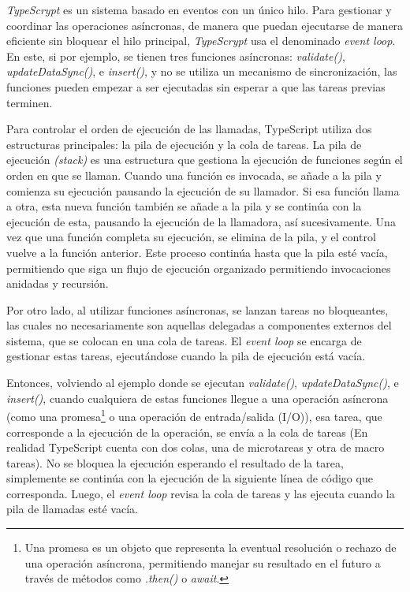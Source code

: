 \textit{TypeScrypt} es un sistema basado en eventos con un único hilo. Para gestionar y coordinar las operaciones asíncronas, de manera que puedan ejecutarse de manera eficiente sin bloquear el hilo principal, \textit{TypeScrypt} usa el denominado \textit{event loop}\cite{ecma262}. En este, si por ejemplo, se tienen tres funciones asíncronas: \textit{validate()}, \textit{updateDataSync()}, e \textit{insert()}, y no se utiliza un mecanismo de sincronización, las funciones pueden empezar a ser ejecutadas sin esperar a que las tareas previas terminen.

Para controlar el orden de ejecución de las llamadas, TypeScript utiliza dos estructuras principales: la pila de ejecución y la cola de tareas. La pila de ejecución \textit{(stack)} es una estructura que gestiona la ejecución de funciones según el orden en que se llaman. Cuando una función es invocada, se añade a la pila y comienza su ejecución pausando la ejecución de su llamador. Si esa función llama a otra, esta nueva función también se añade a la pila y se continúa con la ejecución de esta, pausando la ejecución de la llamadora, así sucesivamente. Una vez que una función completa su ejecución, se elimina de la pila, y el control vuelve a la función anterior. Este proceso continúa hasta que la pila esté vacía, permitiendo que siga un flujo de ejecución organizado permitiendo invocaciones anidadas y recursión.

Por otro lado, al utilizar funciones asíncronas, se lanzan tareas no bloqueantes, las cuales no necesariamente son aquellas delegadas a componentes externos del sistema, que se colocan en una cola de tareas. El \textit{event loop} se encarga de gestionar estas tareas, ejecutándose cuando la pila de ejecución está vacía.

Entonces, volviendo al ejemplo donde se ejecutan \textit{validate()}, \textit{updateDataSync()}, e \textit{insert()}, cuando cualquiera de estas funciones llegue a una operación asíncrona (como una promesa\footnote{Una promesa es un objeto que representa la eventual resolución o rechazo de una operación asíncrona, permitiendo manejar su resultado en el futuro a través de métodos como \textit{.then()} o \textit{await}.} o una operación de entrada/salida (I/O)), esa tarea, que corresponde a la ejecución de la operación, se envía a la cola de tareas (En realidad TypeScript cuenta con dos colas, una de microtareas y otra de macro tareas). No se bloquea la ejecución esperando el resultado de la tarea, simplemente se continúa con la ejecución de la siguiente línea de código que corresponda. Luego, el \textit{event loop} revisa la cola de tareas y las ejecuta cuando la pila de llamadas esté vacía.

